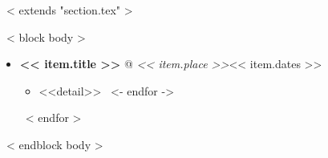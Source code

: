 ~< extends "section.tex" >~

~< block body >~
  \begin{itemize}
    ~< for item in items >~
      \item {\bf << item.title >>} @ {\it << item.place >>}\hfill << item.dates >>
        \begin{itemize}
          ~< for detail in item.details ->~
            \item <<detail>>
            \vspace{0.4em}
          ~<- endfor ->~
        \end{itemize}
    ~< endfor >~
  \end{itemize}
~< endblock body >~
